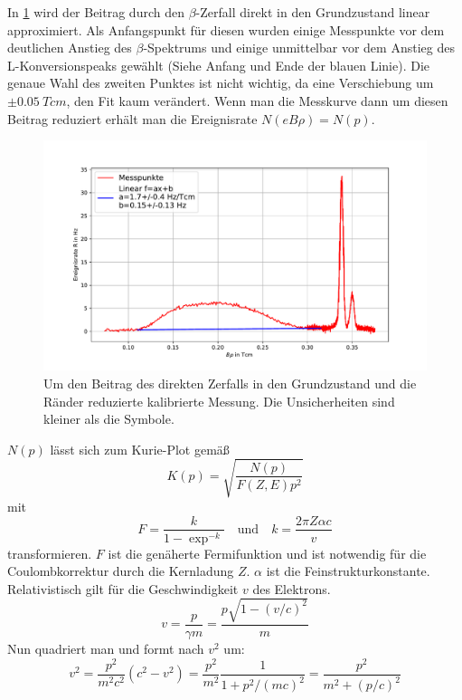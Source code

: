 \documentclass[
	a4paper,
	12pt,
	pagesize,
	ngerman
]{scrartcl}
\begin{document}
	In \cref{fg_kali} wird der Beitrag durch den $\beta$-Zerfall direkt in den Grundzustand linear approximiert.
	Als Anfangspunkt für diesen wurden einige Messpunkte vor dem deutlichen Anstieg des $\beta$-Spektrums und einige unmittelbar vor dem Anstieg des L-Konversionspeaks gewählt (Siehe Anfang und Ende der blauen Linie).
	Die genaue Wahl des zweiten Punktes ist nicht wichtig, da eine Verschiebung um $\pm\SI{0.05}{Tcm}$, den Fit kaum verändert.
	Wenn man die Messkurve dann um diesen Beitrag reduziert erhält man die Ereignisrate $N(eB\rho)=N(p)$.
\begin{figure}[H]
			\includegraphics[width=  \linewidth]{img/kali}
			\caption{
			Um den Beitrag des direkten Zerfalls in den Grundzustand und die Ränder reduzierte kalibrierte Messung.
			Die Unsicherheiten sind kleiner als die Symbole.
			}
			\label{fg_kali}
	\end{figure}
	$N(p)$ lässt sich zum Kurie-Plot gemäß
	\begin{equation}
		K(p) = \sqrt{\frac{N(p)}{F(Z,E)p^2}}
	\end{equation}
	mit
	\begin{equation}
		F = \frac{k}{1-\exp^{-k}} \quad \textrm{und} \quad k=\frac{2\pi Z \alpha c}{v}
	\end{equation}
	transformieren.
	$F$ ist die genäherte Fermifunktion und ist notwendig für die Coulombkorrektur durch die Kernladung $Z$.
	$\alpha$ ist die Feinstrukturkonstante.
	Relativistisch gilt für die Geschwindigkeit $v$ des Elektrons.
	\begin{equation}
		v = \frac{p}{\gamma m} = \frac{p\sqrt{1-(v/c)^2}}{m}
	\end{equation}
	Nun quadriert man und formt nach $v^2$ um:
	\begin{equation}
		v^2 = \frac{p^2}{m^2c^2} (c^2-v^2) = \frac{p^2}{m^2} \frac{1}{1+p^2/(mc)^2} = \frac{p^2}{m^2+(p/c)^2}
	\end{equation}
\end{document}
